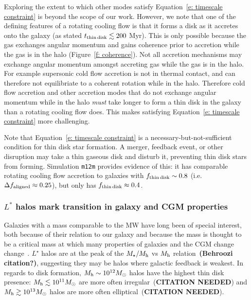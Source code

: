 \documentclass[fleqn,usenatbib]{mnras}
\begin{document}
Exploring the extent to which other modes satisfy Equation~\ref{e: timescale constraint} is beyond the scope of our work.
However, we note that one of the defining features of a rotating cooling flow is that it forms a disk as it accretes onto the galaxy (as stated $t_{\rm thin\,disk} \lesssim 200$ Myr).
This is only possible because the gas exchanges angular momentum and gains coherence prior to accretion while the gas is in the halo (Figure~\ref{f: coherence}).
Not all accretion mechanisms may exchange angular momentum amongst accreting gas while the gas is in the halo.
For example supersonic cold flow accretion is not in thermal contact, and can therefore not equilibriate to a coherent rotation while in the halo.
Therefore cold flow accretion and other accretion modes that do not exchange angular momentum while in the halo \textit{must} take longer to form a thin disk in the galaxy than a rotating cooling flow does.
This makes satisfying Equation~\ref{e: timescale constraint} more challenging.

Note that Equation~\ref{e: timescale constraint} is a necessary-but-not-sufficient condition for thin disk star formation.
A merger, feedback event, or other disruption may take a thin gaseous disk and disturb it, preventing thin disk stars from forming.
Simulation \texttt{m12m} provides evidence of this:
it has comparable rotating cooling flow accretion to galaxies with $f_{\rm thin\,disk}\sim 0.8$ (i.e. $\Delta f_{\rm aligned} \approx 0.25$), but only has $f_{\rm thin\,disk} \approx 0.4$.

\subsubsection{$L^*$ halos mark transition in galaxy and CGM properties}
\label{s: disk formation -- transition}

Galaxies with a mass comparable to the MW have long been of special interest, both because of their relation to our galaxy and because the mass is thought to be a critical mass at which many properties of galaxies and the CGM change change~\citep[e.g.][]{Fielding2017, Correa2017, Dekel2019a}.
$L^\star$ halos are at the peak of the $M_\star/M_{\rm h}$ vs $M_{\rm h}$ relation~\textbf{(Behroozi citation?)}, suggesting they may be halos where galactic feedback is weakest.
In regards to disk formation, $M_{\rm h} \sim 10^{12} M_\odot$ halos have the highest thin disk presence:
$M_{\rm h} \lesssim 10^{11} M_\odot$ are more often irregular~(\textbf{CITATION NEEDED}) and $M_{\rm h} \gtrsim 10^{13} M_\odot$ halos are more often elliptical~(\textbf{CITATION NEEDED}).
\end{document}
